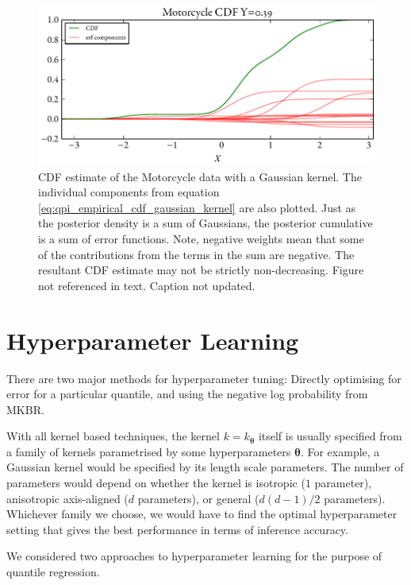 \documentclass[twoside]{article} \usepackage{aistats2017}
\newcommand{\warn}[1]{{\color{RedOrange} #1}}
\begin{document}
		\begin{figure}
			\begin{center}
				\includegraphics[width=\columnwidth]{figures/cumulativeexampleerf}
			\end{center}
			\caption{\small CDF estimate of the Motorcycle data with a Gaussian kernel. The individual components from equation \eqref{eq:qpi_empirical_cdf_gaussian_kernel} are also plotted. Just as the posterior density is a sum of Gaussians, the posterior cumulative is a sum of error functions. Note, negative weights mean that some of the contributions from the terms in the sum are negative. The resultant CDF estimate may not be strictly non-decreasing. \warn{Figure not referenced in text. Caption not updated.}}
			\label{fig:cumulativeexampleerf} 
		\end{figure}
		
\section{Hyperparameter Learning}

	\warn{There are two major methods for hyperparameter tuning: Directly optimising for error for a particular quantile, and using the negative log probability from MKBR.}
	
	With all kernel based techniques, the kernel $k = k_{\bm{\theta}}$ itself is usually specified from a family of kernels parametrised by some hyperparameters $\bm{\theta}$. For example, a Gaussian kernel would be specified by its length scale parameters. The number of parameters would depend on whether the kernel is isotropic ($1$ parameter), anisotropic axis-aligned ($d$ parameters), or general ($d(d - 1)/2$ parameters). Whichever family we choose, we would have to find the optimal hyperparameter setting that gives the best performance in terms of inference accuracy.
	
	We considered two approaches to hyperparameter learning for the purpose of quantile regression.
	
\end{document}
